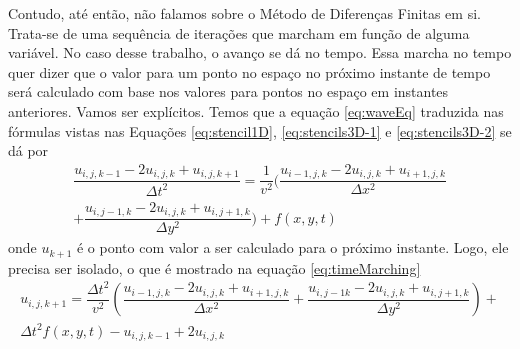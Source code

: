 Contudo, até então, não falamos sobre o Método de Diferenças Finitas
em si. Trata-se de uma sequência de iterações que marcham em função de
alguma variável. No caso desse trabalho, o avanço se dá no tempo. Essa marcha
no tempo quer dizer que o valor para um ponto no espaço no próximo instante de
tempo será calculado com base nos valores para pontos no espaço em instantes
anteriores. Vamos ser explícitos. Temos que a equação \ref{eq:waveEq} traduzida
nas fórmulas vistas nas Equações
\ref{eq:stencil1D}, \ref{eq:stencils3D-1} e \ref{eq:stencils3D-2} se dá por
\begin{equation}
	\begin{split}
		\dfrac{u_{i,j,k-1} - 2u_{i,j,k} + u_{i,j,k+1}}{\Delta t^2} = \dfrac{1}{v^2}(\dfrac{u_{i-1,j,k} - 2u_{i,j,k} + u_{i+1,j,k}}{\Delta x^2} \\+ \dfrac{u_{i,j-1,k} - 2u_{i,j,k} + u_{i,j+1,k}}{\Delta y^2}) + f(x, y, t)
	\end{split}
\end{equation}
onde $u_{k+1}$ é o ponto com valor a ser calculado para o próximo
instante. Logo, ele precisa ser isolado, o que é mostrado na equação
\ref{eq:timeMarching}
\begin{equation}
	\begin{split}
		\label{eq:timeMarching}
		u_{i, j,k+1} = \dfrac{\Delta t^2}{v^2} \left(\dfrac{u_{i-1,j,k} - 2u_{i,j,k} + u_{i+1,j,k}}{\Delta x^2} + \dfrac{u_{i,j-1k} - 2u_{i,j,k} + u_{i,j+1,k}}{\Delta y^2}\right) + \\\Delta t^2f(x, y, t) - u_{i,j,k-1} + 2u_{i,j,k}
	\end{split}
\end{equation}